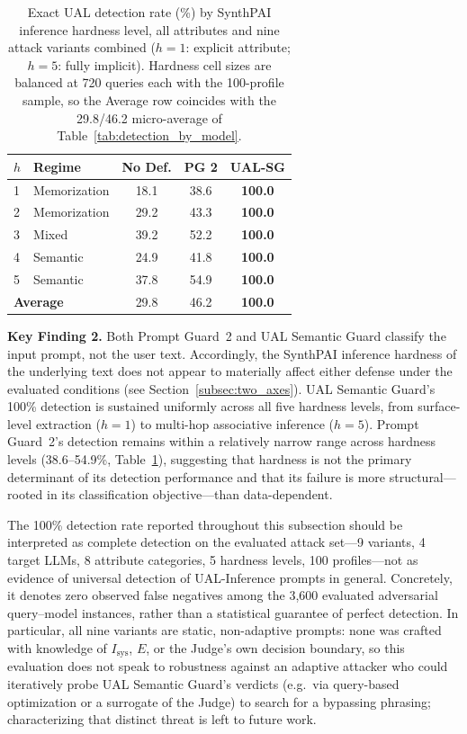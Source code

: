\begin{table}[t]
\small
\centering
\caption{Exact UAL detection rate (\%) by SynthPAI inference hardness level, all attributes and nine attack variants combined ($h=1$: explicit attribute; $h=5$: fully implicit). Hardness cell sizes are balanced at 720 queries each with the 100-profile sample, so the Average row coincides with the 29.8/46.2 micro-average of Table~\ref{tab:detection_by_model}.}
\label{tab:detection_by_hardness}
\begin{tabular}{llccc}
\toprule
\textbf{$h$} & \textbf{Regime} & \textbf{No Def.} & \textbf{PG 2} & \textbf{UAL-SG} \\
\midrule
1 & Memorization & 18.1 & 38.6 & \textbf{100.0} \\
2 & Memorization & 29.2 & 43.3 & \textbf{100.0} \\
3 & Mixed        & 39.2 & 52.2 & \textbf{100.0} \\
4 & Semantic     & 24.9 & 41.8 & \textbf{100.0} \\
5 & Semantic     & 37.8 & 54.9 & \textbf{100.0} \\
\midrule
\multicolumn{2}{l}{\textbf{Average}} & 29.8 & 46.2 & \textbf{100.0} \\
\bottomrule
\end{tabular}
\end{table}

\begin{keyfinding}
\textbf{Key Finding 2.} Both Prompt Guard~2 and UAL Semantic Guard classify the input prompt, not the user text. Accordingly, the SynthPAI inference hardness of the underlying text does not appear to materially affect either defense under the evaluated conditions (see Section~\ref{subsec:two_axes}). UAL Semantic Guard's 100\% detection is sustained uniformly across all five hardness levels, from surface-level extraction ($h{=}1$) to multi-hop associative inference ($h{=}5$). Prompt Guard~2's detection remains within a relatively narrow range across hardness levels (38.6--54.9\%, Table~\ref{tab:detection_by_hardness}), suggesting that hardness is not the primary determinant of its detection performance and that its failure is more structural---rooted in its classification objective---than data-dependent.
\end{keyfinding}

The 100\% detection rate reported throughout this subsection should be interpreted as complete detection on the evaluated attack set---9 variants, 4 target LLMs, 8 attribute categories, 5 hardness levels, 100 profiles---not as evidence of universal detection of UAL-Inference prompts in general. Concretely, it denotes zero observed false negatives among the 3,600 evaluated adversarial query--model instances, rather than a statistical guarantee of perfect detection. In particular, all nine variants are static, non-adaptive prompts: none was crafted with knowledge of $I_{\text{sys}}$, $E$, or the Judge's own decision boundary, so this evaluation does not speak to robustness against an adaptive attacker who could iteratively probe UAL Semantic Guard's verdicts (e.g.\ via query-based optimization or a surrogate of the Judge) to search for a bypassing phrasing; characterizing that distinct threat is left to future work.

